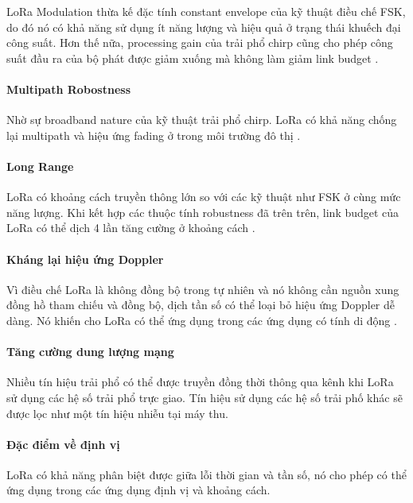 \documentclass{article} %
\begin{document}
	LoRa Modulation thừa kế đặc tính constant envelope của kỹ thuật điều chế FSK, do đó nó có khả năng sử dụng ít năng lượng và hiệu quả ở trạng thái khuếch đại công suất. Hơn thế nữa, processing gain của trải phổ chirp cũng cho phép công suất đầu ra của bộ phát được giảm xuống mà không làm giảm link budget
	\cite{semtech2015an1200}.
	
	\paragraph{Multipath Robostness}\mbox{}
	
	Nhờ sự broadband nature của kỹ thuật trải phổ chirp. LoRa có khả năng chống lại multipath và hiệu ứng fading ở trong môi trường đô thị
	\cite{semtech2015an1200}.
	
	\paragraph{Long Range}\mbox{}
	
	LoRa có khoảng cách truyền thông lớn so với các kỹ thuật như FSK ở cùng mức năng lượng. Khi kết hợp các thuộc tính robustness đã trên trên, link budget của LoRa có thể dịch 4 lần tăng cường ở khoảng cách
	\cite{semtech2015an1200}.
	
	
	\paragraph{Kháng lại hiệu ứng Doppler}\mbox{}
	
	Vì điều chế LoRa là không đồng bộ trong tự nhiên và nó không cần nguồn xung đồng hồ tham chiếu và đồng bộ, dịch tần số có thể loại bỏ hiệu ứng Doppler dễ dàng. Nó khiến cho LoRa có thể ứng dụng trong các ứng dụng có tính di động \cite{semtech2015an1200}.
	\paragraph{Tăng cường dung lượng mạng}\mbox{}
	
	Nhiều tín hiệu trải phổ có thể được truyền đồng thời thông qua kênh khi LoRa sử dụng các hệ số trải phổ trực giao. Tín hiệu sử dụng các hệ số trải phố khác sẽ được lọc như một tín hiệu nhiễu tại máy thu\cite{semtech2015an1200}.
	\paragraph{Đặc điểm về định vị}\mbox{}
	
	LoRa có khả năng phân biệt được giữa lỗi thời gian và tần số, nó cho phép có thể ứng dụng trong các ứng dụng định vị và khoảng cách\cite{semtech2015an1200}.
	
\end{document}
